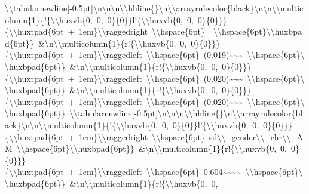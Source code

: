 \documentclass[
  english,
  man]{apa6}
\begin{document}
\textbackslash{}\textbackslash{}tabularnewline{[}-0.5pt{]}\textbackslash{}n\textbackslash{}n\textbackslash{}n\textbackslash{}\textbackslash{}hhline\{\}\textbackslash{}n\textbackslash{}\textbackslash{}arrayrulecolor\{black\}\textbackslash{}n\textbackslash{}n\textbackslash{}\textbackslash{}multicolumn\{1\}\{!\{\textbackslash{}\textbackslash{}huxvb\{0,\ 0,\ 0\}\{0\}\}l!\{\textbackslash{}\textbackslash{}huxvb\{0,\ 0,\ 0\}\{0\}\}\}\{\textbackslash{}\textbackslash{}huxtpad\{6pt\ +\ 1em\}\textbackslash{}\textbackslash{}raggedright\ \textbackslash{}\textbackslash{}hspace\{6pt\}\ \ \textbackslash{}\textbackslash{}hspace\{6pt\}\textbackslash{}\textbackslash{}huxbpad\{6pt\}\}\ \&\textbackslash{}n\textbackslash{}\textbackslash{}multicolumn\{1\}\{r!\{\textbackslash{}\textbackslash{}huxvb\{0,\ 0,\ 0\}\{0\}\}\}\{\textbackslash{}\textbackslash{}huxtpad\{6pt\ +\ 1em\}\textbackslash{}\textbackslash{}raggedleft\ \textbackslash{}\textbackslash{}hspace\{6pt\}\ (0.019)\textasciitilde{}\textasciitilde{}\textasciitilde{}\ \textbackslash{}\textbackslash{}hspace\{6pt\}\textbackslash{}\textbackslash{}huxbpad\{6pt\}\}\ \&\textbackslash{}n\textbackslash{}\textbackslash{}multicolumn\{1\}\{r!\{\textbackslash{}\textbackslash{}huxvb\{0,\ 0,\ 0\}\{0\}\}\}\{\textbackslash{}\textbackslash{}huxtpad\{6pt\ +\ 1em\}\textbackslash{}\textbackslash{}raggedleft\ \textbackslash{}\textbackslash{}hspace\{6pt\}\ (0.020)\textasciitilde{}\textasciitilde{}\textasciitilde{}\ \textbackslash{}\textbackslash{}hspace\{6pt\}\textbackslash{}\textbackslash{}huxbpad\{6pt\}\}\ \&\textbackslash{}n\textbackslash{}\textbackslash{}multicolumn\{1\}\{r!\{\textbackslash{}\textbackslash{}huxvb\{0,\ 0,\ 0\}\{0\}\}\}\{\textbackslash{}\textbackslash{}huxtpad\{6pt\ +\ 1em\}\textbackslash{}\textbackslash{}raggedleft\ \textbackslash{}\textbackslash{}hspace\{6pt\}\ (0.020)\textasciitilde{}\textasciitilde{}\textasciitilde{}\ \textbackslash{}\textbackslash{}hspace\{6pt\}\textbackslash{}\textbackslash{}huxbpad\{6pt\}\}\ \textbackslash{}\textbackslash{}tabularnewline{[}-0.5pt{]}\textbackslash{}n\textbackslash{}n\textbackslash{}n\textbackslash{}\textbackslash{}hhline\{\}\textbackslash{}n\textbackslash{}\textbackslash{}arrayrulecolor\{black\}\textbackslash{}n\textbackslash{}n\textbackslash{}\textbackslash{}multicolumn\{1\}\{!\{\textbackslash{}\textbackslash{}huxvb\{0,\ 0,\ 0\}\{0\}\}l!\{\textbackslash{}\textbackslash{}huxvb\{0,\ 0,\ 0\}\{0\}\}\}\{\textbackslash{}\textbackslash{}huxtpad\{6pt\ +\ 1em\}\textbackslash{}\textbackslash{}raggedright\ \textbackslash{}\textbackslash{}hspace\{6pt\}\ sd\textbackslash{}\textbackslash{}\_gender\textbackslash{}\textbackslash{}\_chr\textbackslash{}\textbackslash{}\_AM\ \textbackslash{}\textbackslash{}hspace\{6pt\}\textbackslash{}\textbackslash{}huxbpad\{6pt\}\}\ \&\textbackslash{}n\textbackslash{}\textbackslash{}multicolumn\{1\}\{r!\{\textbackslash{}\textbackslash{}huxvb\{0,\ 0,\ 0\}\{0\}\}\}\{\textbackslash{}\textbackslash{}huxtpad\{6pt\ +\ 1em\}\textbackslash{}\textbackslash{}raggedleft\ \textbackslash{}\textbackslash{}hspace\{6pt\}\ 0.604\textasciitilde{}\textasciitilde{}\textasciitilde{}\textasciitilde{}\ \textbackslash{}\textbackslash{}hspace\{6pt\}\textbackslash{}\textbackslash{}huxbpad\{6pt\}\}\ \&\textbackslash{}n\textbackslash{}\textbackslash{}multicolumn\{1\}\{r!\{\textbackslash{}\textbackslash{}huxvb\{0,\ 0,\ 
\end{document}
